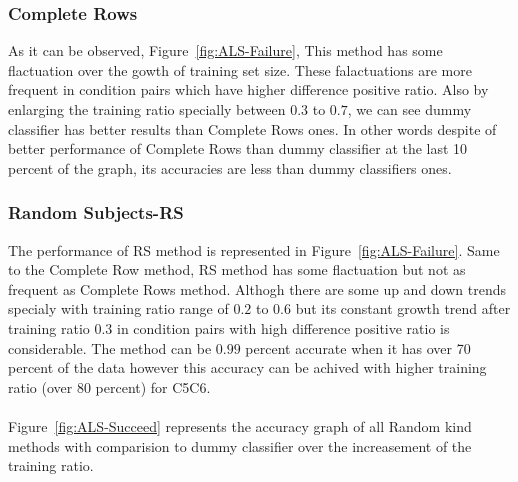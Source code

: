 \documentclass[10pt, conference, compsocconf]{IEEEtran}
\begin{document}
\subsubsection{Complete Rows}
As it can be observed, Figure~\ref{fig:ALS-Failure}, This method has some 
flactuation over the gowth of training set size. These falactuations are more 
frequent in condition pairs which have higher difference positive ratio. 
Also by enlarging the training ratio specially between $0.3$ to $0.7$, 
we can see dummy classifier has better results than Complete Rows ones. 
In other words despite of better performance of Complete Rows than 
dummy classifier at the last 10 percent of the graph, its accuracies 
are less than dummy classifiers ones.  
\\
\subsubsection{Random Subjects-RS}
The performance of RS method is represented in Figure~\ref{fig:ALS-Failure}.
Same to the Complete Row method, RS method has some flactuation but not as frequent 
as Complete Rows method. Althogh there are some up and down trends specialy with 
training ratio range of $0.2$ to $0.6$ but its constant growth trend after 
training ratio $0.3$ in condition pairs with high difference positive ratio is considerable.
The method can be $0.99$ percent accurate when it has over 70 percent of the data however 
this accuracy can be achived with higher training ratio (over 80 percent) for C5C6.  
\\
\\
\noindent Figure~\ref{fig:ALS-Succeed} represents
the accuracy graph of all Random kind methods with comparision to dummy
classifier over the increasement of the training ratio.\\
\end{document}

